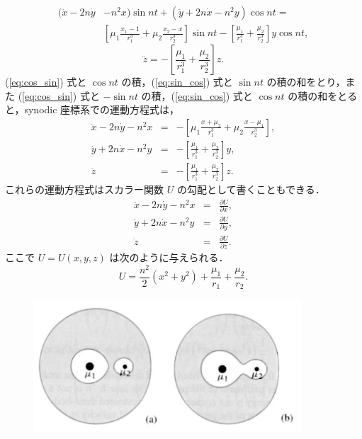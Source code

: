 \documentclass[11pt,a4paper,oneside,onecolumn]{jarticle}
\begin{document}
\begin{equation}
\begin{split}
(\ddot{x} - 2 n \dot{y} & - n^2 x) \sin nt + (\ddot{y} + 2 n \dot{x} - n^2 y) \cos nt =\\
& \left[ \mu_1 \frac{x_1 - 1}{r_1^3} + \mu_2 \frac{x_2 - x}{r_2^3} \right] \sin nt - \left[ \frac{\mu_1}{r_1^3} + \frac{\mu_2}{r_2^3} \right] y \cos nt, \label{eq:sin_cos}
\end{split}
\end{equation}
\begin{equation}
\ddot{z} = - \left[ \frac{\mu_1}{r_1^3} + \frac{\mu_2}{r_2^3} \right] z.
\end{equation}
(\ref{eq:cos_sin}) 式と $\cos nt$ の積，(\ref{eq:sin_cos}) 式と $\sin nt$ の積の和をとり，また (\ref{eq:cos_sin}) 式と $- \sin nt$ の積，(\ref{eq:sin_cos}) 式と $\cos nt$ の積の和をとると，synodic 座標系での運動方程式は，
\begin{eqnarray}
\ddot{x} - 2 n \dot{y} - n^2 x & = & - \left[ \mu_1 \frac{x + \mu_2}{r_1^3} + \mu_2 \frac{x - \mu_1}{r_2^3} \right],\\
\ddot{y} + 2 n \dot{x} - n^2 y & = & - \left[ \frac{\mu_1}{r_1^3} + \frac{\mu_2}{r_2^3} \right] y,\\
\ddot{z} & = & - \left[ \frac{\mu_1}{r_1^3} + \frac{\mu_2}{r_2^3} \right] z.
\end{eqnarray}
これらの運動方程式はスカラー関数 $U$ の勾配として書くこともできる．
\begin{eqnarray}
\ddot{x} - 2 n \dot{y} - n^2 x & = & \frac{\partial U}{\partial x},\\
\ddot{y} + 2 n \dot{x} - n^2 y & = & \frac{\partial U}{\partial y},\\
\ddot{z} & = & \frac{\partial U}{\partial z}.
\end{eqnarray}
ここで $U = U (x, y, z)$ は次のように与えられる．
\begin{equation}
U = \frac{n^2}{2} (x^2 + y^2) + \frac{\mu_1}{r_1} + \frac{\mu_2}{r_2}.
\end{equation}






\begin{figure}[H]
\centering
\includegraphics[width=10cm]{./image/sec3_2.pdf}
\caption{\label{}}
\end{figure}
\end{document}
